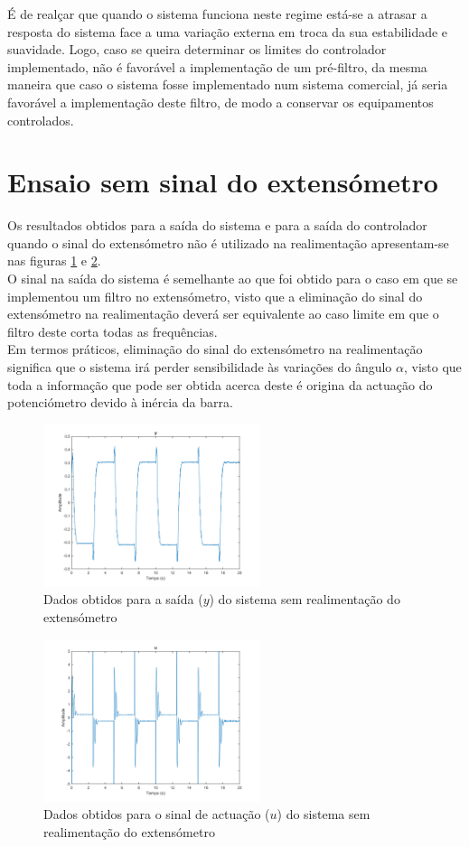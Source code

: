 \documentclass[%
  reprint,
  nofootinbib,
  amsmath,amssymb,
  aps,
  10pt,
  a4paper
]{revtex4-1}
\begin{document}
É de realçar que quando o sistema funciona neste regime está-se a atrasar a resposta do sistema face a uma variação externa em troca da sua estabilidade e suavidade. Logo, caso se queira determinar os limites do controlador implementado, não é favorável a implementação de um pré-filtro, da mesma maneira que caso o sistema fosse implementado num sistema comercial, já seria favorável a implementação deste filtro, de modo a conservar os equipamentos controlados.

\section{Ensaio sem sinal do extensómetro}

Os resultados obtidos para a saída do sistema e para a saída do controlador quando o sinal do extensómetro não é utilizado na realimentação apresentam-se nas figuras \ref{fig:y_next} e \ref{fig:u_next}.\\

O sinal na saída do sistema é semelhante ao que foi obtido para o caso em que se implementou um filtro no extensómetro, visto que a eliminação do sinal do extensómetro na realimentação deverá ser equivalente ao caso limite em que o filtro deste corta todas as frequências.\\

Em termos práticos, eliminação do sinal do extensómetro na realimentação significa que o sistema irá perder sensibilidade às variações do ângulo $\alpha$, visto que toda a informação que pode ser obtida acerca deste é origina da actuação do potenciómetro devido à inércia da barra.

\begin{figure}[t]
\includegraphics[width=2.5in]{../imgs/dados_0n/dados_0n_y.png}
\caption{Dados obtidos para a saída ($y$) do sistema sem realimentação do extensómetro}
\label{fig:y_next}
\end{figure}
\begin{figure}[t]
\includegraphics[width=2.5in]{../imgs/dados_0n/dados_0n_u.png}
\caption{Dados obtidos para o sinal de actuação ($u$) do sistema sem realimentação do extensómetro}
\label{fig:u_next}
\end{figure}
\end{document}

